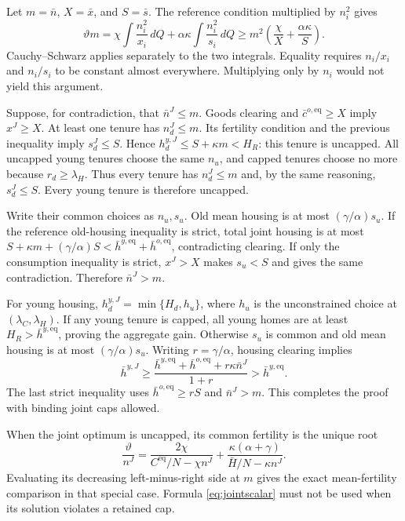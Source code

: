 \documentclass[11pt]{article}
\newcommand{\dd}{\,d}
\newcommand{\eq}{\mathrm{eq}}
\newcommand{\HH}{\bar H}
\newcommand{\tht}{\vartheta}
\begin{document}
Let $m=\bar n$, $X=\bar x$, and $S=\bar s$. The reference condition multiplied by $n_i^2$ gives
\[
 \tht m=\chi\int\frac{n_i^2}{x_i}\dd Q
       +\alpha\kappa\int\frac{n_i^2}{s_i}\dd Q
 \ge m^2\left(\frac\chi X+\frac{\alpha\kappa}S\right).
\]
Cauchy--Schwarz applies separately to the two integrals. Equality requires $n_i/x_i$ and $n_i/s_i$ to be constant almost everywhere. Multiplying only by $n_i$ would not yield this argument.

Suppose, for contradiction, that $\bar n^J\le m$. Goods clearing and $\bar c^{o,\eq}\ge X$ imply $x^J\ge X$. At least one tenure has $n_d^J\le m$. Its fertility condition and the previous inequality imply $s_d^J\le S$. Hence
$h_d^{y,J}\le S+\kappa m<H_R$: this tenure is uncapped. All uncapped young tenures choose the same $n_u$, and capped tenures choose no more because $r_d\ge\lambda_H$. Thus every tenure has $n_d^J\le m$ and, by the same reasoning, $s_d^J\le S$. Every young tenure is therefore uncapped.

Write their common choices as $n_u,s_u$. Old mean housing is at most $(\gamma/\alpha)s_u$. If the reference old-housing inequality is strict, total joint housing is at most
$S+\kappa m+(\gamma/\alpha)S<\bar h^{y,\eq}+\bar h^{o,\eq}$, contradicting clearing. If only the consumption inequality is strict, $x^J>X$ makes $s_u<S$ and gives the same contradiction. Therefore $\bar n^J>m$.

For young housing, $h_d^{y,J}=\min\{H_d,h_u\}$, where $h_u$ is the unconstrained choice at $(\lambda_C,\lambda_H)$. If any young tenure is capped, all young homes are at least $H_R>\bar h^{y,\eq}$, proving the aggregate gain. Otherwise $s_u$ is common and old mean housing is at most $(\gamma/\alpha)s_u$. Writing $r=\gamma/\alpha$, housing clearing implies
\[
 \bar h^{y,J}\ge\frac{\bar h^{y,\eq}+\bar h^{o,\eq}+r\kappa\bar n^J}{1+r}
 >\bar h^{y,\eq}.
\]
The last strict inequality uses $\bar h^{o,\eq}\ge rS$ and $\bar n^J>m$. This completes the proof with binding joint caps allowed.

When the joint optimum is uncapped, its common fertility is the unique root
\begin{equation}
 \frac\tht{n^J}=\frac{2\chi}{C^{\eq}/N-\chi n^J}
 +\frac{\kappa(\alpha+\gamma)}{\HH/N-\kappa n^J}.\label{eq:jointscalar}
\end{equation}
Evaluating its decreasing left-minus-right side at $m$ gives the exact mean-fertility comparison in that special case. Formula \eqref{eq:jointscalar} must not be used when its solution violates a retained cap.
\end{document}
